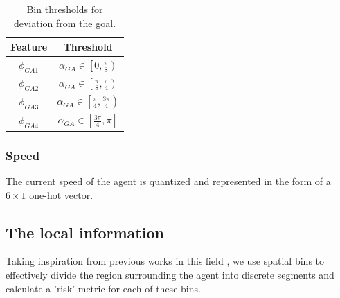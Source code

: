 \begin{table}[htbp]
    \caption{Bin thresholds for deviation from the goal.}
    \label{deviation-from-goal-bins}
    \begin{center}
        \renewcommand{\arraystretch}{1.3}
        \begin{tabular}{|c|c|}
            \hline
            Feature & Threshold \\
            \hline
            $\phi_{GA1}$ & $\alpha_{GA} \in \left[ 0 , \frac{\pi}{8} \right)$ \\
            
            $\phi_{GA2}$ & $\alpha_{GA} \in \left[ \frac{\pi}{8} , \frac{\pi}{4} \right)$ \\
            
            $\phi_{GA3}$ & $\alpha_{GA} \in \left[ \frac{\pi}{4} , \frac{3\pi}{4} \right)$ \\
            
            $\phi_{GA4}$ & $\alpha_{GA} \in \left[ \frac{3\pi}{4} , \pi \right]$ \\
            \hline
        \end{tabular}
    \end{center}
\end{table}

\subsubsection*{Speed}
The current speed of the agent is quantized and represented in the form of a $6 \times 1$ one-hot vector. 


\subsection*{The local information}
Taking inspiration from previous works in this field \cite{fahad_learning_2018} \cite{vasquez_inverse_2014}, we use spatial bins to effectively divide the region surrounding the agent into discrete segments and calculate a 'risk' metric for each of these bins.

